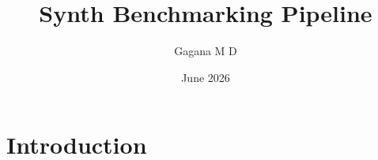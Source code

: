 \documentclass{article}
\title{Synth Benchmarking Pipeline}
\author{Gagana M D}
\date{June 2026}
\begin{document}
\maketitle

\section{Introduction}
\end{document}
